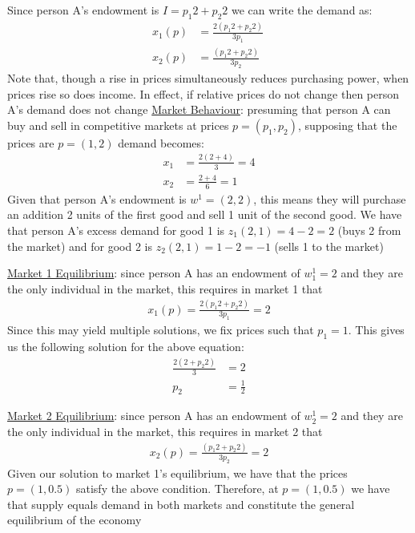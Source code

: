 \documentclass{article}
\begin{document}
  Since person A's endowment is $I = p_{1}2 + p_{2}2$ we can write the demand as:
  \begin{align*}
    x_{1}(p) &= \frac{2(p_{1}2 + p_{2}2)}{3p_{1}} \ \tag{*} \\
    x_{2}(p) &= \frac{(p_{1}2 + p_{2}2)}{3p_{2}} \ \tag{**}
  \end{align*}
  Note that, though a rise in prices simultaneously reduces purchasing power, when prices rise so does income. In effect, if relative prices do not change then person A's demand does not change
  \underline{Market Behaviour}: presuming that person A can buy and sell in competitive markets at prices $p = (p_{1}, p_{2})$, supposing that the prices are $p = (1,2)$ demand becomes:
  \begin{align*}
    x_{1} &= \frac{2(2+4)}{3} = 4 \\
    x_{2} &= \frac{2 + 4}{6} = 1
  \end{align*}
  Given that person A's endowment is $w^{1} = (2,2)$, this means they will purchase an addition 2 units of the first good and sell 1 unit of the second good. We have that person A's excess demand for good 1 is $z_{1}(2,1) = 4 - 2 = 2$ (buys 2 from the market) and for good 2 is $z_{2}(2,1) = 1 - 2 = -1$ (sells 1 to the market)
  \par
  \underline{Market 1 Equilibrium}: since person A has an endowment of $w^{1}_{1} = 2$ and they are the only individual in the market, this requires in market 1 that
  \begin{gather*}
    x_{1}(p) = \frac{2(p_{1}2 + p_{2}2)}{3p_{1}} =  2
  \end{gather*}
  Since this may yield multiple solutions, we fix prices such that $p_{1} = 1$. This gives us the following solution for the above equation:
  \begin{align*}
    \frac{2(2+p_{2}2)}{3} &= 2 \\
    p_{2} &= \frac{1}{2}
  \end{align*}
  \par
  \underline{Market 2 Equilibrium}: since person A has an endowment of $w^{1}_{2} = 2$ and they are the only individual in the market, this requires in market 2 that
  \begin{gather*}
    x_{2}(p) = \frac{(p_{1}2 + p_{2}2)}{3p_{2}} = 2
  \end{gather*}
  Given our solution to market 1's equilibrium, we have that the prices $p = (1, 0.5)$ satisfy the above condition. Therefore, at $p = (1,0.5)$ we have that supply equals demand in both markets and constitute the general equilibrium of the economy
  \par
\vspace{6mm}
\end{document}
